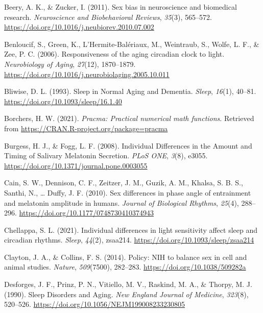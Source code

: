 \documentclass[
  english,
  jou,floatsintext]{apa6}
\newlength{\cslhangindent}
\newenvironment{CSLReferences}[2] %
 {%
  \setlength{\parindent}{0pt}
  \ifodd #1 \everypar{\setlength{\hangindent}{\cslhangindent}}\ignorespaces\fi
  \ifnum #2 > 0
  \setlength{\parskip}{#2\baselineskip}
  \fi
 }%
 {}
\begin{document}
\begin{CSLReferences}{1}{0}
\leavevmode{}%
Beery, A. K., \& Zucker, I. (2011). Sex bias in neuroscience and biomedical research. \emph{Neuroscience and Biobehavioral Reviews}, \emph{35}(3), 565--572. \url{https://doi.org/10.1016/j.neubiorev.2010.07.002}

\leavevmode{}%
Benloucif, S., Green, K., L'Hermite-Balériaux, M., Weintraub, S., Wolfe, L. F., \& Zee, P. C. (2006). Responsiveness of the aging circadian clock to light. \emph{Neurobiology of Aging}, \emph{27}(12), 1870--1879. \url{https://doi.org/10.1016/j.neurobiolaging.2005.10.011}

\leavevmode{}%
Bliwise, D. L. (1993). Sleep in {Normal} {Aging} and {Dementia}. \emph{Sleep}, \emph{16}(1), 40--81. \url{https://doi.org/10.1093/sleep/16.1.40}

\leavevmode{}%
Borchers, H. W. (2021). \emph{Pracma: Practical numerical math functions}. Retrieved from \url{https://CRAN.R-project.org/package=pracma}

\leavevmode{}%
Burgess, H. J., \& Fogg, L. F. (2008). Individual {Differences} in the {Amount} and {Timing} of {Salivary} {Melatonin} {Secretion}. \emph{PLoS ONE}, \emph{3}(8), e3055. \url{https://doi.org/10.1371/journal.pone.0003055}

\leavevmode{}%
Cain, S. W., Dennison, C. F., Zeitzer, J. M., Guzik, A. M., Khalsa, S. B. S., Santhi, N., \ldots{} Duffy, J. F. (2010). Sex differences in phase angle of entrainment and melatonin amplitude in humans. \emph{Journal of Biological Rhythms}, \emph{25}(4), 288--296. \url{https://doi.org/10.1177/0748730410374943}

\leavevmode{}%
Chellappa, S. L. (2021). Individual differences in light sensitivity affect sleep and circadian rhythms. \emph{Sleep}, \emph{44}(2), zsaa214. \url{https://doi.org/10.1093/sleep/zsaa214}

\leavevmode{}%
Clayton, J. A., \& Collins, F. S. (2014). Policy: {NIH} to balance sex in cell and animal studies. \emph{Nature}, \emph{509}(7500), 282--283. \url{https://doi.org/10.1038/509282a}

\leavevmode{}%
Desforges, J. F., Prinz, P. N., Vitiello, M. V., Raskind, M. A., \& Thorpy, M. J. (1990). Sleep {Disorders} and {Aging}. \emph{New England Journal of Medicine}, \emph{323}(8), 520--526. \url{https://doi.org/10.1056/NEJM199008233230805}


\end{CSLReferences}
\end{document}
